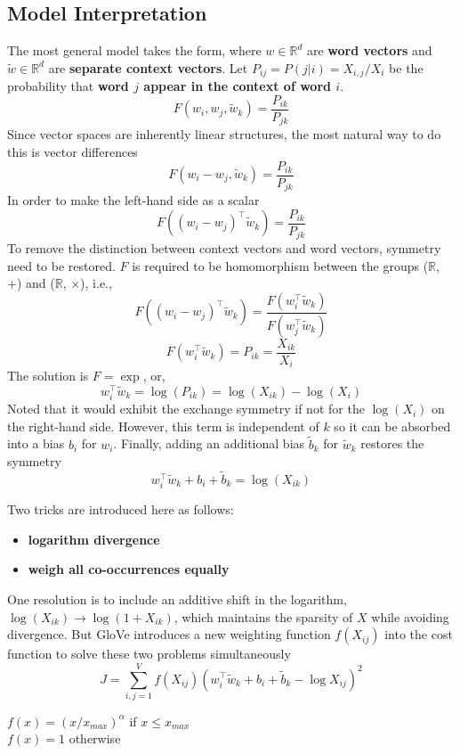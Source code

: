 \documentclass[a3paper, 12pt]{book} %
\begin{document}
\subsection{Model Interpretation}

The most general model takes the form, where $w \in \mathbb{R}^{d}$ are \textbf{word vectors} and $\tilde{w} \in \mathbb{R}^{d}$ are \textbf{separate context vectors}. Let $P_{ij}=P(j|i)=X_{i,j}/X_i$ be the probability that \textbf{word $j$ appear in the context of word $i$}.
$$F(w_i, w_j, \tilde{w}_k) = \frac{P_{ik}}{P_{jk}}$$
Since vector spaces are inherently linear structures, the most natural way to do this is vector differences
$$F(w_i-w_j, \tilde{w}_k) = \frac{P_{ik}}{P_{jk}}$$
In order to make the left-hand side as a scalar
$$F((w_i-w_j)^{\top}\tilde{w}_k) = \frac{P_{ik}}{P_{jk}}$$
To remove the distinction between context vectors and word vectors, symmetry need to be restored. $F$ is required to be homomorphism between the groups ($\mathbb{R}$, +) and ($\mathbb{R}$, $\times$), i.e.,
$$F((w_i-w_j)^{\top}\tilde{w}_k) = \frac{F(w_i^{\top}\tilde{w}_k)}{F(w_j^{\top}\tilde{w}_k)}$$
$$F(w_i^{\top}\tilde{w}_k) = P_{ik} = \frac{X_{ik}}{X_i}$$
The solution is $F=\exp$, or, 
$$ w_i^{\top}\tilde{w}_k = \log{(P_{ik})} = \log{(X_{ik})}-\log{(X_{i})}$$
Noted that it would exhibit the exchange symmetry if not for the $\log{(X_i)}$ on the right-hand side. However, this term is independent of $k$ so it can be absorbed into a bias $b_i$ for $w_i$. Finally, adding an additional bias $\tilde{b}_k$ for  $\tilde{w}_k$ restores the symmetry
$$ w_i^{\top}\tilde{w}_k +  b_i + \tilde{b}_k = \log{(X_{ik})}$$

Two tricks are introduced here as follows:
\begin{itemize}
	\item \textbf{logarithm divergence}
	\item \textbf{weigh all co-occurrences equally}
\end{itemize}
One resolution is to include an additive shift in the logarithm, $\log{(X_{ik})} \to \log{(1+X_{ik})}$, which maintains the sparsity of $X$ while avoiding divergence. But GloVe introduces a new weighting function $f(X_{ij})$ into the cost function to solve these two problems simultaneously
$$J=\sum_{i,j=1}^{V}{f(X_{ij})(w_i^{\top}\tilde{w}_k +  b_i + \tilde{b}_k - \log{X_{ij}})^2}$$

$f(x)=(x/x_{max})^\alpha$ if $x \le x_{max}$ \\
\indent $f(x)=1$ otherwise \\
\end{document}
